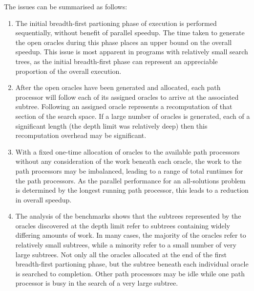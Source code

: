 The issues can be summarised as follows:
\begin{enumerate}
\item{The initial breadth-first partioning phase of execution is performed sequentially,
  without benefit of parallel speedup.  The time taken to generate the open oracles
  during this phase places an upper bound on the overall speedup.  This issue is most
  apparent in programs with relatively small search trees, as the initial breadth-first
  phase can represent an appreciable proportion of the overall execution.}
\item{After the open oracles have been generated and allocated, each path processor will
  follow each of its assigned oracles to arrive at the associated subtree.  Following
  an assigned oracle represents a recomputation of that section of the search space.  If
  a large number of oracles is generated, each of a significant length (the depth limit
  was relatively deep) then this recomputation overhead may be significant.}
\item{With a fixed one-time allocation of oracles to the available path processors without
  any consideration of the work beneath each oracle, the work to the path processors may
  be imbalanced, leading to a range of total runtimes for the path processors.  As the
  parallel performance for an all-solutions problem is determined by the longest running
  path processor, this leads to a reduction in overall speedup.}
\item{The analysis of the benchmarks shows that the subtrees represented by
  the oracles discovered at the depth limit refer to subtrees containing widely differing
  amounts of work.  In many cases, the majority of the oracles refer to relatively small
  subtrees, while a minority refer to a small number of very large subtrees.  Not only
  all the oracles allocated at the end of the first breadth-first partioning phase, but
  the subtree beneath each individual oracle is searched to completion.  Other path
  processors may be idle while one path processor is busy in the search of a very large
  subtree.}
\end{enumerate}

